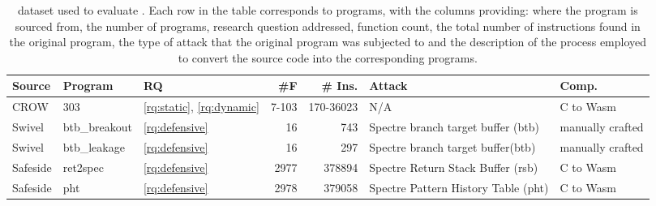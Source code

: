 \begin{table}
\renewcommand\arraystretch{1.1}
\begin{adjustbox}{width=\linewidth,totalheight=\textheight, keepaspectratio}
    \begin{tabular}{p{1.2cm} | l | l | r | r | p{2cm} | p{1cm} }
        \hline
        Source & Program & RQ & \#F & \# Ins. & Attack & Comp. \\
        \hline \hline
        CROW & 303 & \ref{rq:static}, \ref{rq:dynamic} & 7-103 & 170-36023 & N/A & C to Wasm \\
        \hline
        Swivel & btb\_breakout & \ref{rq:defensive} & 16 & 743 & Spectre branch target buffer (btb) & manually crafted \\
        \hline
        Swivel & btb\_leakage & \ref{rq:defensive} & 16 & 297 & Spectre branch target buffer(btb) & manually crafted \\
        \hline
        Safeside & ret2spec & \ref{rq:defensive} & 2977 & 378894 & Spectre Return Stack Buffer (rsb) & C to Wasm \\
        \hline
        Safeside & pht & \ref{rq:defensive} & 2978 & 379058 & Spectre Pattern History Table (pht) & C to Wasm \\

    \end{tabular}
\end{adjustbox}
    
    \caption{\wasm dataset used to evaluate \tool. Each row in the table corresponds to programs, with the columns providing: where the program is sourced from, the number of programs, research question addressed, function count, the total number of instructions found in the original \wasm program, the type of attack that the original program was subjected to and the description of the process employed to convert the source code into the corresponding \wasm programs.}
    \label{tab:corpus}
\end{table}



